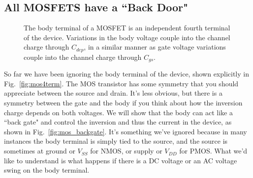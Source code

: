 \subsection{All MOSFETS have a ``Back Door"}
\begin{figure}[b]
\centering
{}
\caption{The body terminal of a MOSFET is an independent fourth terminal of the device.  Variations in the body voltage couple into the channel charge through $C_{dep}$, in a similar manner as gate voltage variations couple into the channel charge through $C_{gs}$.} 
\end{figure}
So far we have been ignoring the body terminal of the device, shown explicitly in Fig.~\ref{fig:mos4term}.  The MOS transistor has some symmetry that you should appreciate between the source and drain.  It's less obvious, but there is a symmetry between the gate and the body if you think about how the inversion charge depends on both voltages. We will show that the body can act like a ``back gate" and control the inversion and thus the current in the device, as shown in Fig.~\ref{fig:mos_backgate}.  It's something we've ignored because in many instances the body terminal is simply tied to the source, and the source is sometimes at ground or $V_{SS}$ for NMOS, or supply or $V_{DD}$ for PMOS.  What we'd like to understand is what happens if there is a DC voltage or an AC voltage swing on the body terminal.
